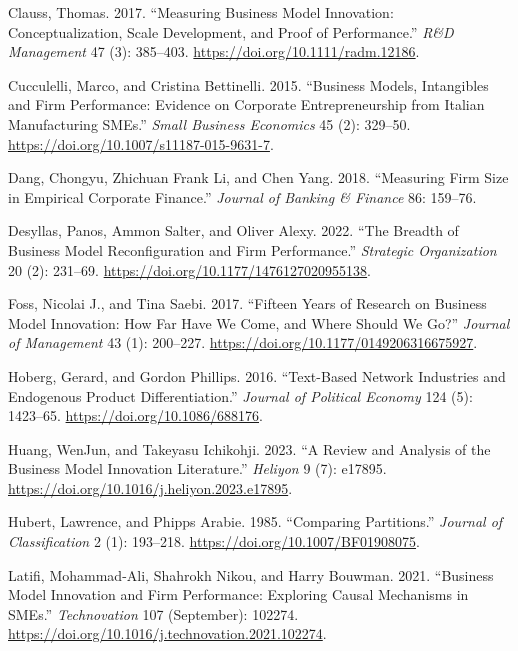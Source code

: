 \documentclass[
]{article}
\newlength{\cslhangindent}
\newenvironment{CSLReferences}[2] %
 {\begin{list}{}{%
  \setlength{\itemindent}{0pt}
  \setlength{\leftmargin}{0pt}
  \setlength{\parsep}{0pt}
  \ifodd #1
   \setlength{\leftmargin}{\cslhangindent}
   \setlength{\itemindent}{-1\cslhangindent}
  \fi
  \setlength{\itemsep}{#2\baselineskip}}}
 {\end{list}}
\begin{document}
\label{refs}
\begin{CSLReferences}{1}{0}
Clauss, Thomas. 2017. {``Measuring Business Model Innovation:
Conceptualization, Scale Development, and Proof of Performance.''}
\emph{R\&D Management} 47 (3): 385--403.
\url{https://doi.org/10.1111/radm.12186}.

Cucculelli, Marco, and Cristina Bettinelli. 2015. {``Business Models,
Intangibles and Firm Performance: Evidence on Corporate Entrepreneurship
from {Italian} Manufacturing {SMEs}.''} \emph{Small Business Economics}
45 (2): 329--50. \url{https://doi.org/10.1007/s11187-015-9631-7}.

Dang, Chongyu, Zhichuan Frank Li, and Chen Yang. 2018. {``Measuring Firm
Size in Empirical Corporate Finance.''} \emph{Journal of Banking \&
Finance} 86: 159--76.

Desyllas, Panos, Ammon Salter, and Oliver Alexy. 2022. {``The Breadth of
Business Model Reconfiguration and Firm Performance.''} \emph{Strategic
Organization} 20 (2): 231--69.
\url{https://doi.org/10.1177/1476127020955138}.

Foss, Nicolai J., and Tina Saebi. 2017. {``Fifteen {Years} of {Research}
on {Business} {Model} {Innovation}: {How} {Far} {Have} {We} {Come}, and
{Where} {Should} {We} {Go}?''} \emph{Journal of Management} 43 (1):
200--227. \url{https://doi.org/10.1177/0149206316675927}.

Hoberg, Gerard, and Gordon Phillips. 2016. {``Text-{Based} {Network}
{Industries} and {Endogenous} {Product} {Differentiation}.''}
\emph{Journal of Political Economy} 124 (5): 1423--65.
\url{https://doi.org/10.1086/688176}.

Huang, WenJun, and Takeyasu Ichikohji. 2023. {``A Review and Analysis of
the Business Model Innovation Literature.''} \emph{Heliyon} 9 (7):
e17895. \url{https://doi.org/10.1016/j.heliyon.2023.e17895}.

Hubert, Lawrence, and Phipps Arabie. 1985. {``Comparing Partitions.''}
\emph{Journal of Classification} 2 (1): 193--218.
\url{https://doi.org/10.1007/BF01908075}.

Latifi, Mohammad-Ali, Shahrokh Nikou, and Harry Bouwman. 2021.
{``Business Model Innovation and Firm Performance: {Exploring} Causal
Mechanisms in {SMEs}.''} \emph{Technovation} 107 (September): 102274.
\url{https://doi.org/10.1016/j.technovation.2021.102274}.


\end{CSLReferences}
\end{document}
